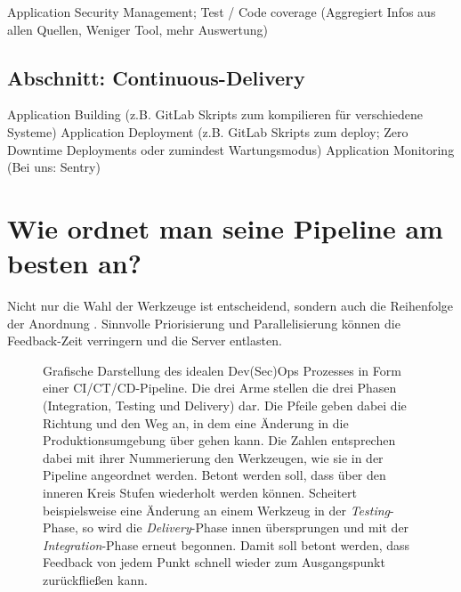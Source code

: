Application Security Management; Test / Code coverage (Aggregiert Infos aus allen Quellen, Weniger Tool, mehr Auswertung)

\subsection{Abschnitt: Continuous-Delivery}
Application Building (z.B. GitLab Skripts zum kompilieren für verschiedene Systeme)
Application Deployment (z.B. GitLab Skripts zum deploy; Zero Downtime Deployments oder zumindest Wartungsmodus)
Application Monitoring (Bei uns: Sentry)


\section{Wie ordnet man seine Pipeline am besten an?}

Nicht nur die Wahl der Werkzeuge ist entscheidend, sondern auch die Reihenfolge der Anordnung \cite{nemytchenkoGitLabCIRun2016}. 
Sinnvolle Priorisierung und Parallelisierung können die Feedback-Zeit verringern und die Server entlasten. 

\begin{figure}[p]
    \vspace*{1cm}
    \setlength{\abovecaptionskip}{10pt}
    \setlength{\belowcaptionskip}{0pt}
    \centering
    \caption{Grafische Darstellung des \glqq idealen\grqq{} Dev(Sec)Ops Prozesses in Form einer CI/CT/CD-Pipeline. 
    Die drei Arme stellen die drei Phasen (Integration, Testing und Delivery) dar. Die Pfeile geben dabei die Richtung und den Weg an, in dem eine Änderung in die Produktionsumgebung über gehen kann. 
    Die Zahlen entsprechen dabei mit ihrer Nummerierung den Werkzeugen, wie sie in der Pipeline angeordnet werden. 
    Betont werden soll, dass über den inneren Kreis Stufen wiederholt werden können. Scheitert beispielsweise eine Änderung an einem Werkzeug in der \emph{Testing}-Phase, so wird die \emph{Delivery}-Phase innen übersprungen und mit der \emph{Integration}-Phase erneut begonnen. 
    Damit soll betont werden, dass Feedback von jedem Punkt schnell wieder zum Ausgangspunkt zurückfließen kann. }
    \label{fig:cicdprocess}
\end{figure}